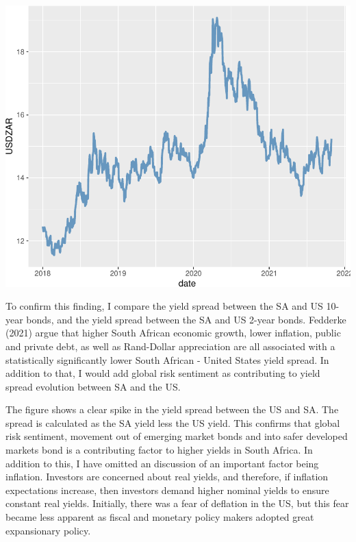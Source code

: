 \documentclass[11pt,preprint, authoryear]{elsarticle}
\numberwithin{equation}{section}
\numberwithin{figure}{section}
\numberwithin{table}{section}
\begin{document}
\includegraphics{Question_1_files/figure-latex/unnamed-chunk-3-1.pdf}

To confirm this finding, I compare the yield spread between the SA and
US 10-year bonds, and the yield spread between the SA and US 2-year
bonds. Fedderke (2021) argue that higher South African economic growth,
lower inflation, public and private debt, as well as Rand-Dollar
appreciation are all associated with a statistically significantly lower
South African - United States yield spread. In addition to that, I would
add global risk sentiment as contributing to yield spread evolution
between SA and the US.

The figure shows a clear spike in the yield spread between the US and
SA. The spread is calculated as the SA yield less the US yield. This
confirms that global risk sentiment, movement out of emerging market
bonds and into safer developed markets bond is a contributing factor to
higher yields in South Africa. In addition to this, I have omitted an
discussion of an important factor being inflation. Investors are
concerned about real yields, and therefore, if inflation expectations
increase, then investors demand higher nominal yields to ensure constant
real yields. Initially, there was a fear of deflation in the US, but
this fear became less apparent as fiscal and monetary policy makers
adopted great expansionary policy.
\end{document}
